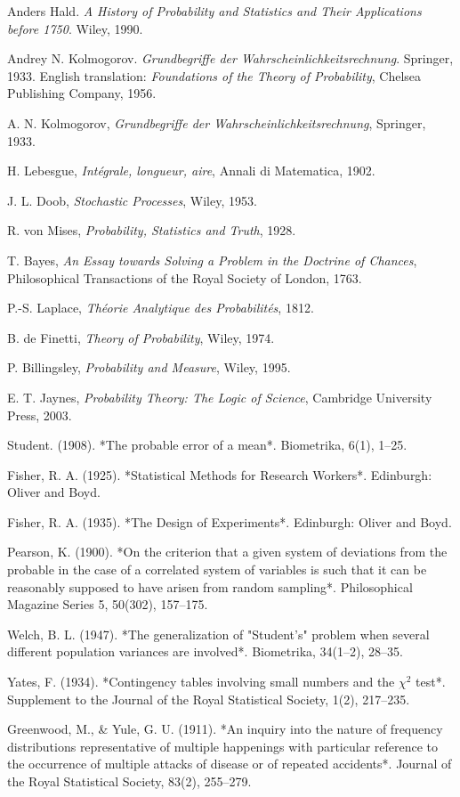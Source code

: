 \documentclass{book}
\begin{document}
\begin{thebibliography}{999}
Anders Hald.  
\textit{A History of Probability and Statistics and Their Applications before 1750}.  
Wiley, 1990.

Andrey N. Kolmogorov.  
\textit{Grundbegriffe der Wahrscheinlichkeitsrechnung}.  
Springer, 1933. English translation: \textit{Foundations of the Theory of Probability}, Chelsea Publishing Company, 1956.

A. N. Kolmogorov, \emph{Grundbegriffe der Wahrscheinlichkeitsrechnung}, Springer, 1933.

H. Lebesgue, \emph{Intégrale, longueur, aire}, Annali di Matematica, 1902.

J. L. Doob, \emph{Stochastic Processes}, Wiley, 1953.

R. von Mises, \emph{Probability, Statistics and Truth}, 1928.

T. Bayes, \emph{An Essay towards Solving a Problem in the Doctrine of Chances}, Philosophical Transactions of the Royal Society of London, 1763.

P.-S. Laplace, \emph{Théorie Analytique des Probabilités}, 1812.

B. de Finetti, \emph{Theory of Probability}, Wiley, 1974.

P. Billingsley, \emph{Probability and Measure}, Wiley, 1995.

E. T. Jaynes, \emph{Probability Theory: The Logic of Science}, Cambridge University Press, 2003.

Student. (1908). *The probable error of a mean*. Biometrika, 6(1), 1–25.

Fisher, R. A. (1925). *Statistical Methods for Research Workers*. Edinburgh: Oliver and Boyd.

Fisher, R. A. (1935). *The Design of Experiments*. Edinburgh: Oliver and Boyd.

Pearson, K. (1900). *On the criterion that a given system of deviations from the probable in the case of a correlated system of variables is such that it can be reasonably supposed to have arisen from random sampling*. Philosophical Magazine Series 5, 50(302), 157–175.

Welch, B. L. (1947). *The generalization of "Student’s" problem when several different population variances are involved*. Biometrika, 34(1–2), 28–35.

Yates, F. (1934). *Contingency tables involving small numbers and the $\chi^2$ test*. Supplement to the Journal of the Royal Statistical Society, 1(2), 217–235.

Greenwood, M., \& Yule, G. U. (1911). *An inquiry into the nature of frequency distributions representative of multiple happenings with particular reference to the occurrence of multiple attacks of disease or of repeated accidents*. Journal of the Royal Statistical Society, 83(2), 255–279.

\end{thebibliography}
\end{document}

